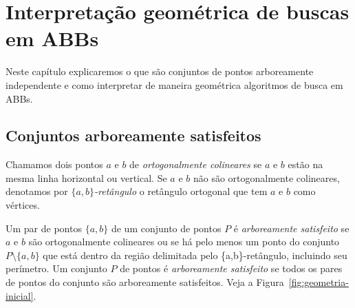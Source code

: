 
\chapter{Interpretação geométrica de buscas em ABBs}
\label{cap:geometria}

Neste capítulo explicaremos o que são conjuntos de pontos arboreamente independente e como interpretar de maneira geométrica algoritmos de busca em ABBs.

\section{Conjuntos arboreamente satisfeitos}

Chamamos dois pontos $a$ e $b$ de \textit{ortogonalmente colineares} se $a$ e $b$ estão na mesma linha horizontal ou vertical. Se $a$ e $b$ não são ortogonalmente colineares, denotamos por \textit{$\{a,b\}$-retângulo} o retângulo ortogonal que tem $a$ e $b$ como vértices.

Um par de pontos $\{a,b\}$ de um conjunto de pontos $P$ é \textit{arboreamente satisfeito} se $a$ e $b$ são ortogonalmente colineares ou se há pelo menos um ponto do conjunto \( P \setminus \{a,b\} \) que está dentro da região delimitada pelo \{a,b\}-retângulo, incluindo seu perímetro. Um conjunto $P$ de pontos é \textit{arboreamente satisfeito} se todos os pares de pontos do conjunto são arboreamente satisfeitos. Veja a Figura~\ref{fig:geometria-inicial}.

